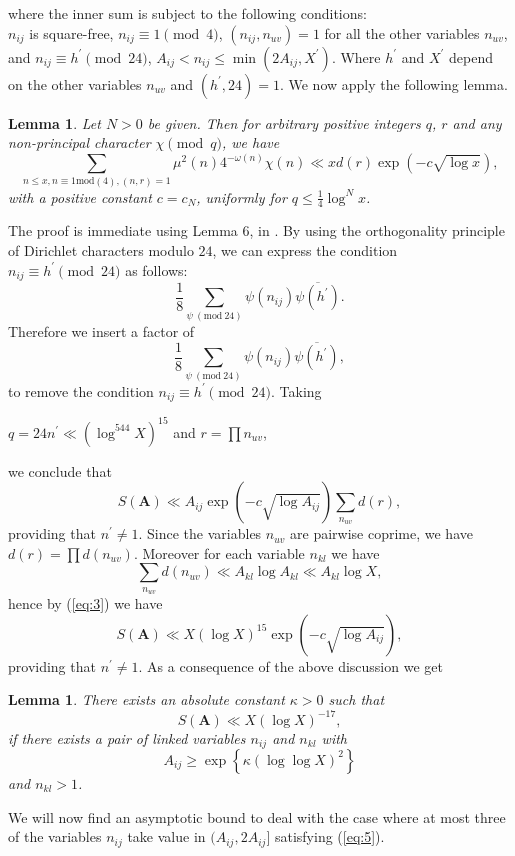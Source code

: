 \documentclass[11pt]{article}
\newcommand{\A}{ \textbf{A} }
\newtheorem{lemma}[theorem]{Lemma}
\begin{document}
where the inner sum is subject to the following conditions:\\
$n_{ij}$ is square-free, $n_{ij}\equiv 1\pmod{4}$, $(n_{ij}, n_{uv})=1$ for all the other variables $n_{uv}$, and $n_{ij}\equiv h^{\prime}\pmod{24}$, $A_{ij}<n_{ij}\leq \min(2A_{ij},X^{\prime})$.
Where $h^{\prime}$ and $X^{\prime}$ depend on the other variables $n_{uv}$ and $(h^{\prime},24)=1$. We now apply the following lemma.
\begin{lemma}\label{lemma6}
Let $N>0$ be given. Then for arbitrary positive integers $q$, $r$ and any non-principal character $\chi\pmod{q}$, we have
$$\sum\limits_{n\leq x, n\equiv 1 \text{mod}(4), (n,r)=1} \mu^2(n)4^{-\omega(n)}\chi (n)\ll xd(r)\exp(-c\sqrt{\log x}),$$
with a positive constant $c=c_{N}$, uniformly for $q\leq \frac{1}{4}\log^N x$.
\end{lemma}
\noindent The proof is immediate using Lemma 6, in \cite{HeathBrown}.
\noindent  By using the orthogonality principle of Dirichlet characters modulo $24$, we can express the condition $n_{ij}\equiv h^{\prime}\pmod{24}$ as follows: 
$$\frac{1}{8}\sum_{\psi\:(\text{mod}\:24)}\psi (n_{ij}) \overline{\psi (h^{\prime})}.$$
Therefore we insert a factor of
$$\frac{1}{8}\sum_{\psi\:(\text{mod}\:24)}\psi (n_{ij}) \overline{\psi (h^{\prime})},$$
to remove the condition $n_{ij}\equiv h^{\prime}\pmod{24}$.
Taking
\begin{center}
$q=24n^{\prime}\ll (\log^{544} X)^{15}$ and $r=\prod n_{uv}$,
\end{center}
we conclude that
$$S(\A)\ll A_{ij}\exp(-c\sqrt{\log A_{ij}})\sum\limits_{n_{uv}} d(r),$$
providing that $n^{\prime}\neq 1$. Since the variables $n_{uv}$ are pairwise coprime, we have $d(r)=\prod d(n_{uv})$. Moreover for each variable $n_{kl}$ we have
$$\sum\limits_{n_{uv}}d(n_{uv})\ll A_{kl}\log A_{kl}\ll A_{kl}\log X,$$
hence by (\ref{eq:3}) we have
$$S(\A)\ll X(\log X)^{15}\exp(-c\sqrt{\log A_{ij}}),$$
providing that $n^{\prime}\neq 1$. As a consequence of the above discussion we get
\begin{lemma}\label{lemma7}
There exists an absolute constant $\kappa>0$ such that 
$$S(\A)\ll X(\log X)^{-17},$$  
if there exists a pair of linked variables $n_{ij}$ and $n_{kl}$ with
\begin{equation}\label{eq:5}
A_{ij}\geq \exp\left\{\kappa (\log \log X)^{2}\right\}
\end{equation} 
and $n_{kl}>1$.
\end{lemma}
\noindent We will now find an asymptotic bound to deal with the case where at most three of the variables $n_{ij}$ take value in $(A_{ij},2A_{ij}]$ satisfying (\ref{eq:5}).\\
\end{document}
